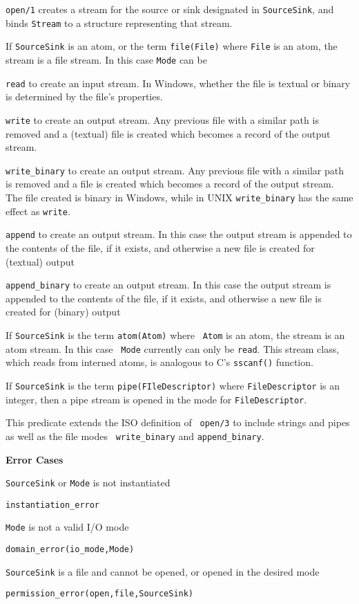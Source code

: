 \begin{description}

%
{\tt open/1} creates a stream for the source or sink designated in
{\tt SourceSink}, and binds {\tt Stream} to a structure representing
that stream.  
%
\bi
\item If {\tt SourceSink} is an atom, or the term {\tt file(File)}
where {\tt File} is an atom, the stream is a file stream.  In this
case {\tt Mode} can be 
\bi
\item {\tt read} to create an input stream.  In Windows, whether the
file is textual or binary is determined by the file's properties.
%
\item {\tt write} to create an output stream.  Any previous file with
a similar path is removed and a (textual) file is created which becomes
a record of the output stream.  
%
\item {\tt write\_binary} to create an output stream.  Any previous file with
a similar path is removed and a file is created which becomes
a record of the output stream.  The file created is binary in Windows,
while in UNIX {\tt write\_binary} has the same effect as {\tt write}.
%
\item {\tt append} to create an output stream.  In this case the
output stream is appended to the contents of the file, if it exists,
and otherwise a new file is created for (textual) output
%
\item {\tt append\_binary} to create an output stream.  In this case the
output stream is appended to the contents of the file, if it exists,
and otherwise a new file is created for (binary) output
\ei
\item If {\tt SourceSink} is the term {\tt atom(Atom)} where {\tt
Atom} is an atom, the stream is an atom stream.  In this case {\tt
Mode} currently can only be {\tt read}.  This stream class, which
reads from interned atoms, is analogous to C's {\tt sscanf()}
function.
%
\item If {\tt SourceSink} is the term {\tt pipe(FIleDescriptor)}
where {\tt FileDescriptor} is an integer, then a pipe stream is opened
in the mode for {\tt FileDescriptor}.
\ei

\compatability This predicate extends the ISO definition of {\tt
open/3} to include strings and pipes as well as the file modes {\tt
write\_binary} and {\tt append\_binary}.

{\bf Error Cases}
\bi
\item 	{\tt SourceSink} or {\tt Mode} is not instantiated
\bi
\item 	{\tt instantiation\_error}
\ei
%
\item 	{\tt Mode} is not a valid I/O mode
\bi
\item 	{\tt domain\_error(io\_mode,Mode)}
\ei
%
\item 	{\tt SourceSink} is a file and cannot be opened, or opened in
the desired mode 
\bi
\item 	{\tt permission\_error(open,file,SourceSink)}
\ei
\ei


\end{description}

